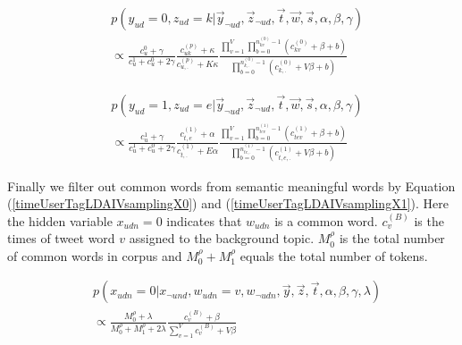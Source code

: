 \documentclass[runningheads,a4paper]{llncs}
\begin{document}
\begin{scriptsize}
\begin{equation}
\label{timeUserTagLDAIVJointSamplingForY0Z}
\begin{aligned}
&p(y_{ud}=0,z_{ud}=k|\vec{y}_{\neg{ud}},\vec{z}_{\neg{ud}},\vec{t},\vec{w},\vec{s},\alpha,\beta,\gamma)\\
&\propto \frac{c_u^{0}+\gamma}{c_u^{1}+c_u^{0}+2\gamma}\frac{c^{(p)}_{uk}+\kappa}{c^{(p)}_{u,.}+K\kappa}
        \frac{\prod_{v=1}^{V}\prod_{b=0}^{n^{(0)}_{kv}-1}{(c^{(0)}_{kv}+\beta+b)}  }{\prod_{b=0}^{n^{(0)}_{k,.}-1}(c^{(0)}_{k,.}+V\beta+b) }
\end{aligned}
\end{equation}
\end{scriptsize}

\begin{scriptsize}
\begin{equation}
\label{timeUserTagLDAIVJointSamplingForY1Z}
\begin{aligned}
&p(y_{ud}=1,z_{ud}=e|\vec{y}_{\neg{ud}},\vec{z}_{\neg{ud}},\vec{t},\vec{w},\vec{s},\alpha,\beta,\gamma)\\
&\propto \frac{c_u^{1}+\gamma}{c_u^{1}+c_u^{0}+2\gamma}\frac{c_{t,e}^{(1)}+\alpha}{c_{t,.}^{(1)}+E\alpha}
\frac{\prod_{v=1}^{V}\prod_{b=0}^{n^{(1)}_{tev}-1}(c^{(1)}_{tev}+\beta+b)}{\prod_{b=0}^{n^{(1)}_{te,.}-1}(c^{(1)}_{t,e,.}+V\beta+b)}
\end{aligned}
\end{equation}
\end{scriptsize}

Finally we filter out common words from semantic meaningful words by Equation (\ref{timeUserTagLDAIVsamplingX0}) and (\ref{timeUserTagLDAIVsamplingX1}).
Here the hidden variable \(x_{udn}=0\) indicates that \(w_{udn}\) is a common word.
\(c^{(B)}_v\) is the times of tweet word \(v\) assigned to the background topic.
\(M^{\rho}_0\) is the total number of common words in corpus and \(M^{\rho}_0+M^{\rho}_1\) equals the total number of tokens.

\begin{scriptsize}
\begin{equation}
\label{timeUserTagLDAIVsamplingX0}
\begin{aligned}
&p(x_{udn}=0|x_{\neg{und}},w_{udn}=v,w_{\neg{udn}},\vec{y},\vec{z},\vec{t},\alpha,\beta,\gamma,\lambda)\\
&\propto \frac{M^{\rho}_0+\lambda}{M^{\rho}_0+M^{\rho}_1+2\lambda}\frac{c^{(B)}_v+\beta}{\sum_{v=1}^{V}c^{(B)}_v+V\beta}
\end{aligned}
\end{equation}
\end{scriptsize}
\end{document}
